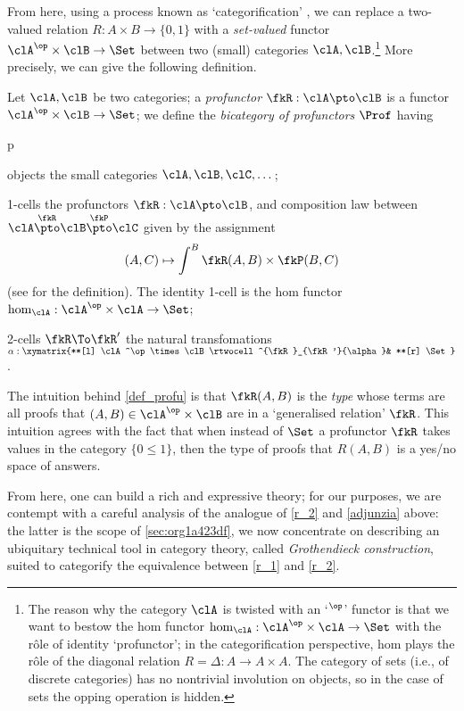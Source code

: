 From here, using a process known as `categorification' \cite{baez1998categorification}, we can replace a two-valued relation $R : A\times B \to \{0,1\}$ with a \emph{set-valued} functor $\clA^\op\times\clB \to \Set$ between two (small) categories $\clA,\clB$.\footnote{The reason why the category $\clA$ is twisted with an `$^\op$' functor is that we want to bestow the hom functor $\hom_{\clA} : \clA^\op\times\clA \to \Set$ with the r\^ole of identity `profunctor'; in the categorification perspective, hom plays the r\^ole of the diagonal relation $R=\Delta : A\to A\times A$. The category of sets (i.e., of discrete categories) has no nontrivial involution on objects, so in the case of sets the opping operation is hidden.} More precisely, we can give the following definition.
\begin{definition}[Profunctor]\label{def_profu}
	Let $\clA,\clB$ be two categories; a \emph{profunctor} $\fkR : \clA \pto \clB$ is a functor $\clA^\op\times\clB \to \Set$; we define the \emph{bicategory of profunctors} $\Prof$ having
	\begin{enumtag}{p}
		\item objects the small categories $\clA,\clB,\clC,\dots$;
		\item 1-cells the profunctors $\fkR : \clA \pto \clB$, and composition law between $\clA \overset{\fkR}{\pto} \clB \overset{\fkP}{\pto} \clC$ given by the assignment
		\[ (A,C)\mapsto \int^B \fkR(A,B)\times\fkP(B,C) \]
		(see \cite[6.2.10]{Bor2} for the definition). The identity 1-cell is the hom functor $\hom_\clA : \clA^\op\times\clA \to \Set$;
		\item 2-cells $\fkR\To\fkR'$ the natural transfomations $\alpha : \xymatrix{**[l] \clA^\op\times\clB \rtwocell^{\fkR}_{\fkR'}{\alpha}& **[r] \Set}$.
	\end{enumtag}
\end{definition}
The intuition behind \autoref{def_profu} is that $\fkR(A,B)$ is the \emph{type} whose terms are all proofs that $(A,B)\in\clA^\op\times\clB$ are in a  `generalised relation' $\fkR$. This intuition agrees with the fact that when instead of $\Set$ a profunctor $\fkR$ takes values in the category $\{0\le 1\}$, then the type of proofs that $R(A,B)$ is a yes/no space of answers.

From here, one can build a rich and expressive theory; for our purposes, we are contempt with a careful analysis of the analogue of \ref{r_2} and \eqref{adjunzia} above: the latter is the scope of \autoref{sec:org1a423df}, we now concentrate on describing an ubiquitary technical tool in category theory, called \emph{Gro\-then\-dieck construction}, suited to categorify the equivalence between \ref{r_1} and \ref{r_2}.


